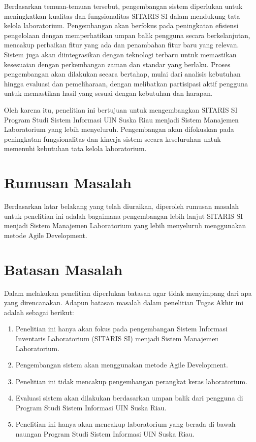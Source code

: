 Berdasarkan temuan-temuan tersebut, pengembangan sistem diperlukan untuk meningkatkan kualitas dan fungsionalitas SITARIS SI dalam mendukung tata kelola laboratorium. Pengembangan akan berfokus pada peningkatan efisiensi pengelolaan dengan memperhatikan umpan balik pengguna secara berkelanjutan, mencakup perbaikan fitur yang ada dan penambahan fitur baru yang relevan. Sistem juga akan diintegrasikan dengan teknologi terbaru untuk memastikan kesesuaian dengan perkembangan zaman dan standar yang berlaku. Proses pengembangan akan dilakukan secara bertahap, mulai dari analisis kebutuhan hingga evaluasi dan pemeliharaan, dengan melibatkan partisipasi aktif pengguna untuk memastikan hasil yang sesuai dengan kebutuhan dan harapan.

Oleh karena itu, penelitian ini bertujuan untuk mengembangkan SITARIS SI Program Studi Sistem Informasi UIN Suska Riau menjadi Sistem Manajemen Laboratorium yang lebih menyeluruh. Pengembangan akan difokuskan pada peningkatan fungsionalitas dan kinerja sistem secara keseluruhan untuk memenuhi kebutuhan tata kelola laboratorium.
\section{Rumusan Masalah}
Berdasarkan latar belakang yang telah diuraikan, diperoleh rumusan masalah untuk penelitian ini adalah bagaimana pengembangan lebih lanjut SITARIS SI menjadi Sistem Manajemen Laboratorium yang lebih menyeluruh menggunakan metode Agile Development.

\section{Batasan Masalah}
Dalam melakukan penelitian diperlukan batasan agar tidak menyimpang dari apa yang direncanakan. Adapun batasan masalah dalam penelitian Tugas Akhir ini adalah sebagai berikut:
\begin{enumerate}
	\item Penelitian ini hanya akan fokus pada pengembangan Sistem Informasi Inventaris Laboratorium (SITARIS SI) menjadi Sistem Manajemen Laboratorium.
	\item Pengembangan sistem akan menggunakan metode Agile Development.
	\item Penelitian ini tidak mencakup pengembangan perangkat keras laboratorium.
	\item Evaluasi sistem akan dilakukan berdasarkan umpan balik dari pengguna di Program Studi Sistem Informasi UIN Suska Riau.
	\item Penelitian ini hanya akan mencakup laboratorium yang berada di bawah naungan Program Studi Sistem Informasi UIN Suska Riau.
\end{enumerate}

